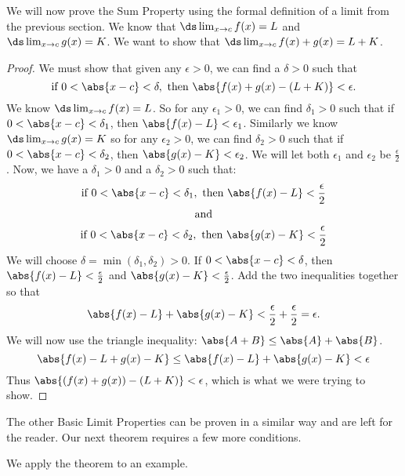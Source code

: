 We will now prove the Sum Property using the formal definition of a limit from the previous section. We know that $\ds \lim_{x\to c}f(x) = L$ and  $\ds\lim_{x\to c} g(x) = K$. We want to show that $\ds \lim_{x\to c}f(x)+g(x)=L+K$.

\begin{proof}
We must show that given any $\epsilon>0$, we can find a $\delta>0$ such that
\[\text{if }0<\abs{x-c}<\delta,\text{ then }\abs{f(x)+g(x)-(L+K)}<\epsilon.\]
We know $\ds \lim_{x\to c}f(x) = L$. So for any $\epsilon_1 >0$, we can find $\delta_1>0$ such that if $0<\abs{x-c}<\delta_1$, then $\abs{f(x)-L}<\epsilon_1$. Similarly we know $\ds\lim_{x\to c} g(x) = K$ so for any $\epsilon_2>0$, we can find $\delta_2>0$ such that if  $0<\abs{x-c}<\delta_2$, then $\abs{g(x)-K}<\epsilon_2$. We will let both $\epsilon_1$ and $\epsilon_2$ be $\frac{\epsilon}{2}$. Now, we have a $\delta_1>0$ and a $\delta_2>0$ such that:
\begin{gather*}
\text{if }0<\abs{x-c}<\delta_1,\text{ then }\abs{f(x)-L}<\frac{\epsilon}{2} \\
\text{and} \\
\text{if }0<\abs{x-c}<\delta_2,\text{ then }\abs{g(x)-K}<\frac{\epsilon}{2}
\end{gather*}
We will choose $\delta=\min(\delta_1,\delta_2)>0$. If $0<\abs{x-c}<\delta$, then $\abs{f(x)-L}<\frac{\epsilon}{2}$ and  $\abs{g(x)-K}<\frac{\epsilon}{2}$.  Add the two inequalities together so that
\[\abs{f(x)-L}+\abs{g(x)-K}<\frac{\epsilon}{2}+\frac{\epsilon}{2}=\epsilon.\]
We will now use the triangle inequality: $\abs{A+B}\leq\abs{A}+\abs{B}$.
\[\abs{f(x)-L+g(x)-K}\leq\abs{f(x)-L}+\abs{g(x)-K}<\epsilon\]
Thus $\abs{(f(x)+g(x))-(L+K)}<\epsilon$, which is what we were trying to show.
\end{proof}

The other Basic Limit Properties can be proven in a similar way and are left for the reader.  Our next theorem requires a few more conditions.



We apply the theorem to an example.

